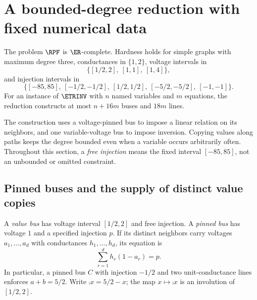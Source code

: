 \section{A bounded-degree reduction with fixed numerical data}
\label{sec:resistive}

\begin{theorem}
\label{thm:rpf-complete}
The problem $\RPF$ is $\ER$-complete. Hardness holds for simple graphs with
maximum degree three, conductances in $\{1,2\}$, voltage intervals in
\[
 \bigl\{[1/2,2],\ [1,1],\ [1,4]\bigr\},
\]
and injection intervals in
\[
 \bigl\{[-85,85],\ [-1/2,-1/2],\ [1/2,1/2],\
 [-5/2,-5/2],\ [-1,-1]\bigr\}.
\]
For an instance of $\ETRINV$ with $n$ named variables and $m$ equations,
the reduction constructs at most $n+16m$ buses and $18m$ lines.
\end{theorem}

The construction uses a voltage-pinned bus to impose a linear relation on
its neighbors, and one variable-voltage bus to impose inversion.
Copying values along paths keeps the degree bounded even when a variable
occurs arbitrarily often. Throughout this section, a \emph{free injection}
means the fixed interval $[-85,85]$, not an unbounded or omitted constraint.

\subsection{Pinned buses and the supply of distinct value copies}
\label{subsec:copies}

A \emph{value bus} has voltage interval $[1/2,2]$ and free injection.
A \emph{pinned bus} has voltage $1$ and a specified injection $p$.
If its distinct neighbors carry voltages $a_1,\ldots,a_d$ with conductances
$h_1,\ldots,h_d$, its equation is
\begin{equation}
 \sum_{r=1}^d h_r(1-a_r)=p.
 \label{eq:pinned}
\end{equation}
In particular, a pinned bus $C$ with injection $-1/2$ and two unit-conductance
lines enforces $a+b=5/2$. Write $\comp{x}=5/2-x$; the map $x\mapsto\comp{x}$
is an involution of $[1/2,2]$.

